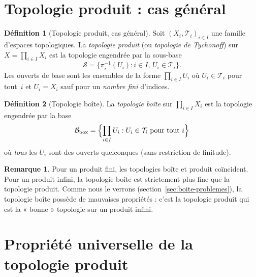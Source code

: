 \documentclass[12pt,a4paper,openany]{book}
\theoremstyle{definition}
\newtheorem{definition}{Définition}[chapter]
\theoremstyle{cours}
\theoremstyle{coursnormal}
\newtheorem{remarque}[theoreme]{Remarque}
\begin{document}
\section{Topologie produit : cas général}
\label{sec:topologie-produit-general}

\begin{definition}[Topologie produit, cas général]
\label{def:topologie-produit-generale}
Soit $(X_i, \mathcal{T}_i)_{i \in I}$ une famille d'espaces topologiques.
La \emph{topologie produit} (ou \emph{topologie de Tychonoff})
sur $X = \prod_{i \in I} X_i$ est la topologie engendrée par la sous-base
\[
\mathcal{S} = \bigl\{ \pi_i^{-1}(U_i) : i \in I, \, U_i \in \mathcal{T}_i \bigr\}.
\]
Les ouverts de base sont les ensembles de la forme $\prod_{i \in I} U_i$ où
$U_i \in \mathcal{T}_i$ pour tout~$i$ et $U_i = X_i$ sauf pour un \emph{nombre
fini} d'indices.
\end{definition}

\begin{definition}[Topologie boîte]
\label{def:topologie-boite}
La \emph{topologie boîte} sur $\prod_{i \in I} X_i$ est la topologie engendrée par la base
\[
\mathcal{B}_{\mathrm{box}} = \Bigl\{ \prod_{i \in I} U_i : U_i \in \mathcal{T}_i
\text{ pour tout } i \Bigr\}
\]
où \emph{tous} les $U_i$ sont des ouverts quelconques (sans restriction de finitude).
\end{definition}

\begin{remarque}
\label{rem:boite-vs-produit}
Pour un produit fini, les topologies boîte et produit coïncident. Pour un produit
infini, la topologie boîte est strictement plus fine que la topologie produit.
Comme nous le verrons (section~\ref{sec:boite-problemes}), la topologie boîte
possède de mauvaises propriétés : c'est la topologie produit qui est la « bonne »
topologie sur un produit infini.
\end{remarque}

\section{Propriété universelle de la topologie produit}
\label{sec:propriete-universelle-produit}
\end{document}
